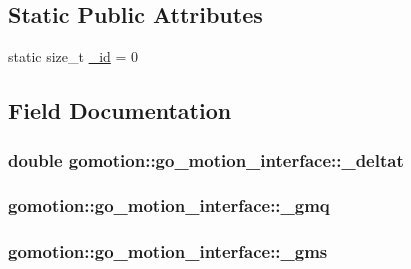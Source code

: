 \subsection*{Static Public Attributes}
\begin{DoxyCompactItemize}
\item 
static size\-\_\-t \hyperlink{structgomotion_1_1go__motion__interface_aba0811a381c6f1a25fa0f68dfde0b829}{\-\_\-id} = 0
\end{DoxyCompactItemize}


\subsection{Field Documentation}
\hypertarget{structgomotion_1_1go__motion__interface_a450ed54375d304ec8e2b00be571f7fb2}{
\subsubsection[{\-\_\-deltat}]{\setlength{\rightskip}{0pt plus 5cm}double gomotion\-::go\-\_\-motion\-\_\-interface\-::\-\_\-deltat}}\label{structgomotion_1_1go__motion__interface_a450ed54375d304ec8e2b00be571f7fb2}
\hypertarget{structgomotion_1_1go__motion__interface_ab7801d0e1621e18025d2a3446648ac5e}{
\subsubsection[{\-\_\-gmq}]{ gomotion\-::go\-\_\-motion\-\_\-interface\-::\-\_\-gmq}}\label{structgomotion_1_1go__motion__interface_ab7801d0e1621e18025d2a3446648ac5e}
\hypertarget{structgomotion_1_1go__motion__interface_a027cf7ca47ea59b2ce242a9ada705ea5}{
\subsubsection[{\-\_\-gms}]{ gomotion\-::go\-\_\-motion\-\_\-interface\-::\-\_\-gms}}\label{structgomotion_1_1go__motion__interface_a027cf7ca47ea59b2ce242a9ada705ea5}
